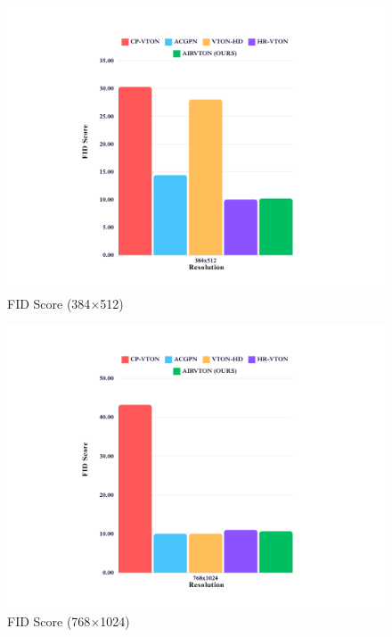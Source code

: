 \begin{figure}
    \includegraphics[width=\textwidth]{components/images/3.png}
    \caption{FID Score (384$\times$512)}
    \label{fig:fid-score-med}
\end{figure}

\begin{figure}
    \includegraphics[width=\textwidth]{components/images/4.png}
    \caption{FID Score (768$\times$1024)}
    \label{fig:fid-score-high}
\end{figure}

